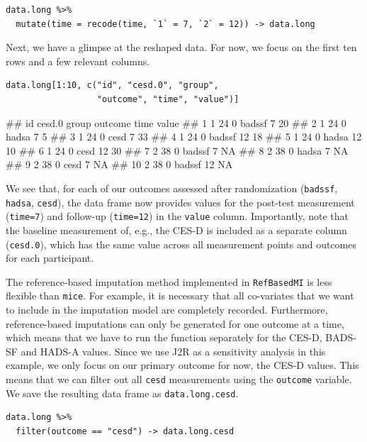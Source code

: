 \begin{lstlisting}
data.long %>% 
  mutate(time = recode(time, `1` = 7, `2` = 12)) -> data.long
\end{lstlisting}

Next, we have a glimpse at the reshaped data. For now, we focus on the first ten rows and a few relevant columns.

\begin{lstlisting}
data.long[1:10, c("id", "cesd.0", "group", 
                  "outcome", "time", "value")]
\end{lstlisting}

\begin{example}
##     id cesd.0 group outcome  time value
##  1   1     24     0 badssf      7    20
##  2   1     24     0 hadsa       7     5
##  3   1     24     0 cesd        7    33
##  4   1     24     0 badssf     12    18
##  5   1     24     0 hadsa      12    10
##  6   1     24     0 cesd       12    30
##  7   2     38     0 badssf      7    NA
##  8   2     38     0 hadsa       7    NA
##  9   2     38     0 cesd        7    NA
## 10   2     38     0 badssf     12    NA
\end{example}

We see that, for each of our outcomes assessed after randomization (\texttt{badssf}, \texttt{hadsa}, \texttt{cesd}), the data frame now provides values for the post-test measurement (\texttt{time=7}) and follow-up (\texttt{time=12}) in the \texttt{value} column. Importantly, note that the baseline measurement of, e.g., the CES-D is included as a separate column (\texttt{cesd.0}), which has the same value across all measurement points and outcomes for each participant.

The reference-based imputation method implemented in \texttt{RefBasedMI} is less flexible than \texttt{mice}. For example, it is necessary that all co-variates that we want to include in the imputation model are completely recorded. Furthermore, reference-based imputations can only be generated for one outcome at a time, which means that we have to run the function separately for the CES-D, BADS-SF and HADS-A values. Since we use J2R as a sensitivity analysis in this example, we only focus on our primary outcome for now, the CES-D values. This means that we can filter out all \texttt{cesd} measurements using the \texttt{outcome} variable. We save the resulting data frame as \texttt{data.long.cesd}.


\begin{lstlisting}
data.long %>% 
  filter(outcome == "cesd") -> data.long.cesd
\end{lstlisting}


